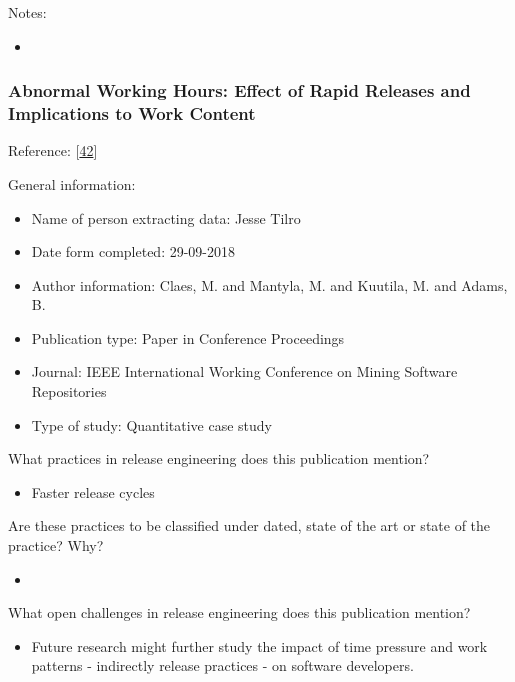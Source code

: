 \documentclass[]{book}
\providecommand{\tightlist}{%
  \setlength{\itemsep}{0pt}\setlength{\parskip}{0pt}}
\begin{document}
Notes:

\begin{itemize}
\item
\end{itemize}

\subsubsection{Abnormal Working Hours: Effect of Rapid Releases and
Implications to Work
Content}\label{abnormal-working-hours-effect-of-rapid-releases-and-implications-to-work-content}

Reference: {[}\protect\hyperlink{ref-claes2017a}{42}{]}

General information:

\begin{itemize}
\tightlist
\item
  Name of person extracting data: Jesse Tilro
\item
  Date form completed: 29-09-2018
\item
  Author information: Claes, M. and Mantyla, M. and Kuutila, M. and
  Adams, B.
\item
  Publication type: Paper in Conference Proceedings
\item
  Journal: IEEE International Working Conference on Mining Software
  Repositories
\item
  Type of study: Quantitative case study
\end{itemize}

What practices in release engineering does this publication mention?

\begin{itemize}
\tightlist
\item
  Faster release cycles
\end{itemize}

Are these practices to be classified under dated, state of the art or
state of the practice? Why?

\begin{itemize}
\item
\end{itemize}

What open challenges in release engineering does this publication
mention?

\begin{itemize}
\tightlist
\item
  Future research might further study the impact of time pressure and
  work patterns - indirectly release practices - on software developers.
\end{itemize}
\end{document}
